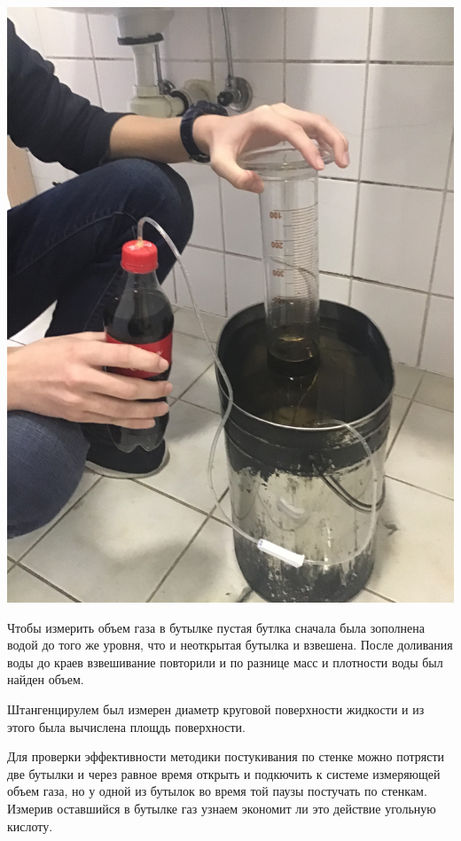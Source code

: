 \documentclass[12pt,a4paper]{scrartcl}
\begin{document}
\begin{flushleft}
\includegraphics[scale=0.1]{ToiletFun}
\end{flushleft}
Чтобы измерить объем газа в бутылке пустая бутлка сначала была зополнена водой до того же уровня, что и неоткрытая бутылка и взвешена. После доливания воды до краев взвешивание повторили и по разнице масс и плотности воды был найден объем.

Штангенцирулем был измерен диаметр круговой поверхности жидкости и из этого была вычислена площдь поверхности.

Для проверки эффективности методики постукивания по стенке можно потрясти две бутылки и через равное время открыть и подкючить к системе измеряющей объем газа, но у одной из бутылок во время той паузы постучать по стенкам. Измерив оставшийся в бутылке газ узнаем экономит ли это действие угольную кислоту.
\end{document}
